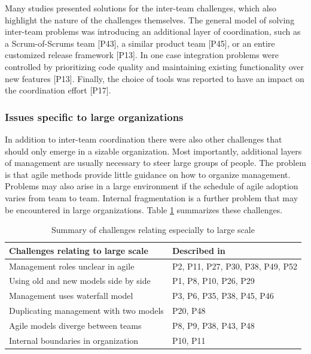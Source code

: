 \documentclass[preprint,authoryear,12pt]{elsarticle}
\begin{document}
Many studies presented solutions for the inter-team challenges, which also
highlight the nature of the challenges themselves. The general model of solving
inter-team problems was introducing an additional layer of coordination, such as
a Scrum-of-Scrums team [P43], a similar product team [P45], or an entire
customized release framework [P13]. In one case integration problems were
controlled by prioritizing code quality and maintaining existing functionality
over new features [P13]. Finally, the choice of tools was reported to have an
impact on the coordination effort [P17].



\subsubsection{Issues specific to large organizations}

In addition to inter-team coordination there were also other challenges that
should only emerge in a sizable organization.
Most importantly, additional layers of management are usually necessary to steer
large groups of people. The problem is that agile methods provide little
guidance on how to organize management.
Problems may also arise in a large environment if the schedule of agile adoption
varies from team to team. Internal fragmentation is a further problem that may
be encountered in large organizations.
Table \ref{table:challenges_largescale} summarizes these challenges.

\begin{table}[b]
    \centering
    \begin{tabular}{ >{\raggedright\arraybackslash}p{}
                     >{\raggedright\arraybackslash}p{} }
        \toprule
        Challenges relating to large scale  &  Described in \\
        \midrule
        Management roles unclear in agile       &  P2, P11, P27, P30, P38, P49, P52 \\
        Using old and new models side by side   &  P1, P8, P10, P26, P29 \\
        Management uses waterfall model         &  P3, P6, P35, P38, P45, P46 \\
        Duplicating management with two models  &  P20, P48 \\
        Agile models diverge between teams      &  P8, P9, P38, P43, P48 \\
        Internal boundaries in organization     &  P10, P11 \\
        \bottomrule
    \end{tabular}
    \caption{Summary of challenges relating especially to large scale}
    \label{table:challenges_largescale}
\end{table}
\end{document}
